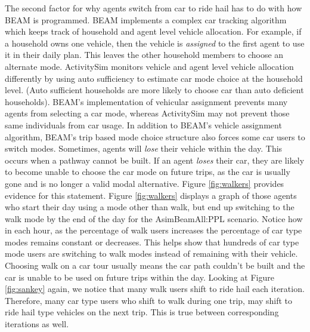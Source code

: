 \documentclass[fancy, masters]{byuthesis}
\begin{document}
The second factor for why agents switch from car to ride hail has to do with how BEAM is programmed. BEAM implements a complex car tracking algorithm which keeps track of household and agent level vehicle allocation. For example, if a household owns one vehicle, then the vehicle is \emph{assigned} to the first agent to use it in their daily plan. This leaves the other household members to choose an alternate mode. ActivitySim monitors vehicle and agent level vehicle allocation differently by using auto sufficiency to estimate car mode choice at the household level. (Auto sufficient households are more likely to choose car than auto deficient households). BEAM's implementation of vehicular assignment prevents many agents from selecting a car mode, whereas ActivitySim may not prevent those same individuals from car usage. In addition to BEAM's vehicle assignment algorithm, BEAM's trip based mode choice structure also forces some car users to switch modes. Sometimes, agents will \emph{lose} their vehicle within the day. This occurs when a pathway cannot be built. If an agent \emph{loses} their car, they are likely to become unable to choose the car mode on future trips, as the car is usually gone and is no longer a valid modal alternative. Figure \ref{fig:walkers} provides evidence for this statement. Figure \ref{fig:walkers} displays a graph of those agents who start their day using a mode other than walk, but end up switching to the walk mode by the end of the day for the AsimBeamAll:PPL scenario. Notice how in each hour, as the percentage of walk users increases the percentage of car type modes remains constant or decreases. This helps show that hundreds of car type mode users are switching to walk modes instead of remaining with their vehicle. Choosing walk on a car tour usually means the car path couldn't be built and the car is unable to be used on future trips within the day. Looking at Figure \ref{fig:sankey} again, we notice that many walk users shift to ride hail each iteration. Therefore, many car type users who shift to walk during one trip, may shift to ride hail type vehicles on the next trip. This is true between corresponding iterations as well.
\end{document}

